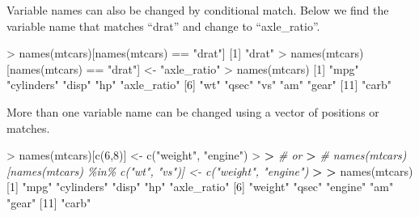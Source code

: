 \documentclass[
]{book}
\newenvironment{Shaded}{\begin{snugshade}}{\end{snugshade}}
\newcommand{\CommentTok}[1]{\textcolor[rgb]{0.56,0.35,0.01}{\textit{#1}}}
\newcommand{\DecValTok}[1]{\textcolor[rgb]{0.00,0.00,0.81}{#1}}
\newcommand{\ErrorTok}[1]{\textcolor[rgb]{0.64,0.00,0.00}{\textbf{#1}}}
\newcommand{\FunctionTok}[1]{\textcolor[rgb]{0.00,0.00,0.00}{#1}}
\newcommand{\NormalTok}[1]{#1}
\newcommand{\OtherTok}[1]{\textcolor[rgb]{0.56,0.35,0.01}{#1}}
\newcommand{\SpecialCharTok}[1]{\textcolor[rgb]{0.00,0.00,0.00}{#1}}
\newcommand{\StringTok}[1]{\textcolor[rgb]{0.31,0.60,0.02}{#1}}
\begin{document}
Variable names can also be changed by conditional match. Below we find the variable name that matches ``drat'' and change to ``axle\_ratio''.

\begin{Shaded}
\begin{Highlighting}[]
\SpecialCharTok{\textgreater{}} \FunctionTok{names}\NormalTok{(mtcars)[}\FunctionTok{names}\NormalTok{(mtcars) }\SpecialCharTok{==} \StringTok{"drat"}\NormalTok{]}
\NormalTok{[}\DecValTok{1}\NormalTok{] }\StringTok{"drat"}
\SpecialCharTok{\textgreater{}} \FunctionTok{names}\NormalTok{(mtcars)[}\FunctionTok{names}\NormalTok{(mtcars) }\SpecialCharTok{==} \StringTok{"drat"}\NormalTok{] }\OtherTok{\textless{}{-}} \StringTok{"axle\_ratio"}
\SpecialCharTok{\textgreater{}} \FunctionTok{names}\NormalTok{(mtcars)}
\NormalTok{ [}\DecValTok{1}\NormalTok{] }\StringTok{"mpg"}        \StringTok{"cylinders"}  \StringTok{"disp"}       \StringTok{"hp"}         \StringTok{"axle\_ratio"}
\NormalTok{ [}\DecValTok{6}\NormalTok{] }\StringTok{"wt"}         \StringTok{"qsec"}       \StringTok{"vs"}         \StringTok{"am"}         \StringTok{"gear"}      
\NormalTok{[}\DecValTok{11}\NormalTok{] }\StringTok{"carb"}      
\end{Highlighting}
\end{Shaded}

More than one variable name can be changed using a vector of positions or matches.

\begin{Shaded}
\begin{Highlighting}[]
\SpecialCharTok{\textgreater{}} \FunctionTok{names}\NormalTok{(mtcars)[}\FunctionTok{c}\NormalTok{(}\DecValTok{6}\NormalTok{,}\DecValTok{8}\NormalTok{)] }\OtherTok{\textless{}{-}} \FunctionTok{c}\NormalTok{(}\StringTok{"weight"}\NormalTok{, }\StringTok{"engine"}\NormalTok{)}
\SpecialCharTok{\textgreater{}} 
\ErrorTok{\textgreater{}} \CommentTok{\# or}
\ErrorTok{\textgreater{}} \CommentTok{\# names(mtcars)[names(mtcars) \%in\% c("wt", "vs")] \textless{}{-} c("weight", "engine")}
\ErrorTok{\textgreater{}} 
\ErrorTok{\textgreater{}} \FunctionTok{names}\NormalTok{(mtcars)}
\NormalTok{ [}\DecValTok{1}\NormalTok{] }\StringTok{"mpg"}        \StringTok{"cylinders"}  \StringTok{"disp"}       \StringTok{"hp"}         \StringTok{"axle\_ratio"}
\NormalTok{ [}\DecValTok{6}\NormalTok{] }\StringTok{"weight"}     \StringTok{"qsec"}       \StringTok{"engine"}     \StringTok{"am"}         \StringTok{"gear"}      
\NormalTok{[}\DecValTok{11}\NormalTok{] }\StringTok{"carb"}      
\end{Highlighting}
\end{Shaded}
\end{document}
